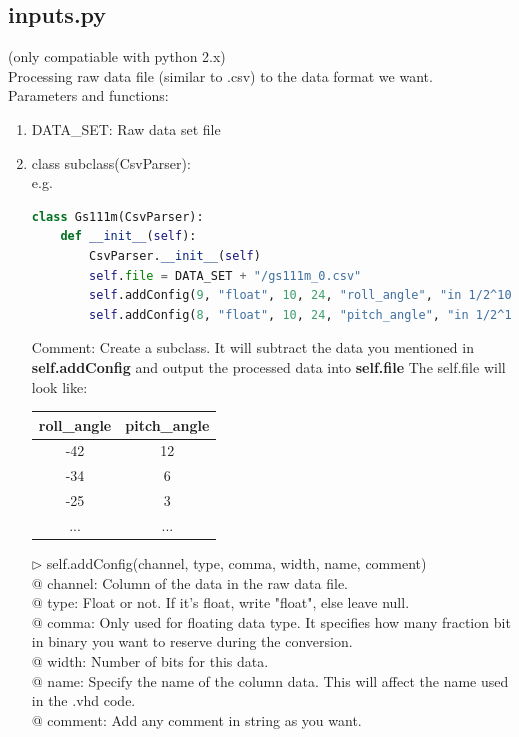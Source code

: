 \documentclass{article}
\theoremstyle{definition}
\begin{document}
\subsection{inputs.py}\label{inputs.py}
(only compatiable with python 2.x)\\
Processing raw data file (similar to .csv) to the data format we want.\\
Parameters and functions:
\begin{enumerate}
	\item DATA\_SET: Raw data set file
	\item class subclass(CsvParser): \\
e.g.
\begin{lstlisting}[language=Python]
class Gs111m(CsvParser):
	def __init__(self):
		CsvParser.__init__(self)
		self.file = DATA_SET + "/gs111m_0.csv"
		self.addConfig(9, "float", 10, 24, "roll_angle", "in 1/2^10 rad")
		self.addConfig(8, "float", 10, 24, "pitch_angle", "in 1/2^10 rad")
\end{lstlisting}
Comment: Create a subclass. It will subtract the data you mentioned in \textbf{self.addConfig} and output the processed data into \textbf{self.file}
The self.file will look like:
\begin{center}
\begin{tabular}{ c|c} 
 \hline
 roll\_angle & pitch\_angle \\ 
 \hline
 -42 & 12 \\ 
 \hline
 -34 & 6\\ 
 \hline
 -25 & 3\\ 
 ...&...
\end{tabular}
\end{center}
$\triangleright$ self.addConfig(channel, type, comma, width, name, comment)\\
@ channel: Column of the data in the raw data file.\\
@ type: Float or not. If it's float, write "float", else leave null.\\
@ comma: Only used for floating data type. It specifies how many fraction bit in binary you want to reserve during the conversion.\\
@ width: Number of bits for this data.\\
@ name: Specify the name of the column data. This will affect the name used in the .vhd code.\\
@ comment: Add any comment in string as you want.


\end{enumerate}
\end{document}
